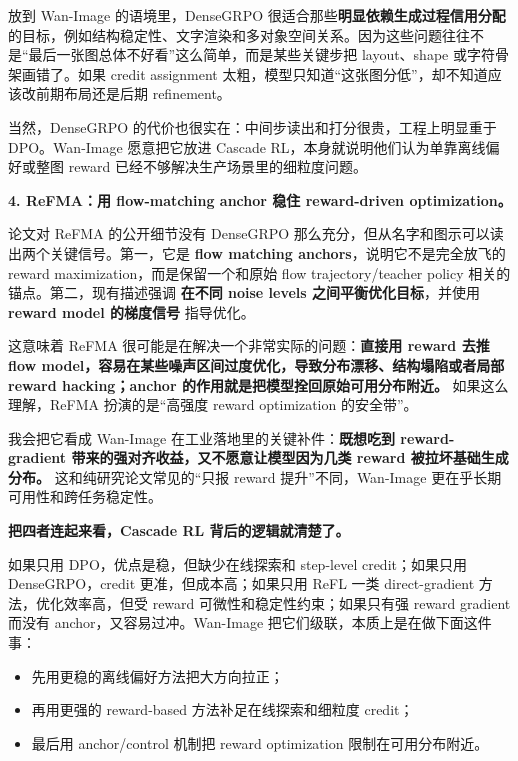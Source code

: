放到 Wan-Image 的语境里，DenseGRPO 很适合那些\textbf{明显依赖生成过程信用分配}的目标，例如结构稳定性、文字渲染和多对象空间关系。因为这些问题往往不是“最后一张图总体不好看”这么简单，而是某些关键步把 layout、shape 或字符骨架画错了。如果 credit assignment 太粗，模型只知道“这张图分低”，却不知道应该改前期布局还是后期 refinement。

当然，DenseGRPO 的代价也很实在：中间步读出和打分很贵，工程上明显重于 DPO。Wan-Image 愿意把它放进 Cascade RL，本身就说明他们认为单靠离线偏好或整图 reward 已经不够解决生产场景里的细粒度问题。

\textbf{4. ReFMA：用 flow-matching anchor 稳住 reward-driven optimization。}

论文对 ReFMA 的公开细节没有 DenseGRPO 那么充分，但从名字和图示可以读出两个关键信号。第一，它是 \textbf{flow matching anchors}，说明它不是完全放飞的 reward maximization，而是保留一个和原始 flow trajectory/teacher policy 相关的锚点。第二，现有描述强调 \textbf{在不同 noise levels 之间平衡优化目标}，并使用 \textbf{reward model 的梯度信号} 指导优化。

这意味着 ReFMA 很可能是在解决一个非常实际的问题：\textbf{直接用 reward 去推 flow model，容易在某些噪声区间过度优化，导致分布漂移、结构塌陷或者局部 reward hacking；anchor 的作用就是把模型拴回原始可用分布附近。} 如果这么理解，ReFMA 扮演的是“高强度 reward optimization 的安全带”。

我会把它看成 Wan-Image 在工业落地里的关键补件：\textbf{既想吃到 reward-gradient 带来的强对齐收益，又不愿意让模型因为几类 reward 被拉坏基础生成分布。} 这和纯研究论文常见的“只报 reward 提升”不同，Wan-Image 更在乎长期可用性和跨任务稳定性。

\textbf{把四者连起来看，Cascade RL 背后的逻辑就清楚了。}

如果只用 DPO，优点是稳，但缺少在线探索和 step-level credit；如果只用 DenseGRPO，credit 更准，但成本高；如果只用 ReFL 一类 direct-gradient 方法，优化效率高，但受 reward 可微性和稳定性约束；如果只有强 reward gradient 而没有 anchor，又容易过冲。Wan-Image 把它们级联，本质上是在做下面这件事：

\begin{itemize}[leftmargin=1.5em]
  \item 先用更稳的离线偏好方法把大方向拉正；
  \item 再用更强的 reward-based 方法补足在线探索和细粒度 credit；
  \item 最后用 anchor/control 机制把 reward optimization 限制在可用分布附近。
\end{itemize}

